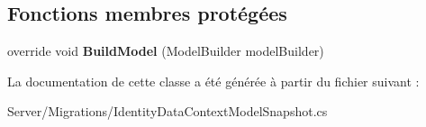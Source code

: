 \subsection*{Fonctions membres protégées}
\begin{DoxyCompactItemize}
\item 
\mbox{\label{class_mediwatch_1_1_server_1_1_migrations_1_1_identity_data_context_model_snapshot_a0d86a793fac77b235571009b08163338}} 
override void {\bfseries Build\+Model} (Model\+Builder model\+Builder)
\end{DoxyCompactItemize}


La documentation de cette classe a été générée à partir du fichier suivant \+:\begin{DoxyCompactItemize}
\item 
Server/\+Migrations/Identity\+Data\+Context\+Model\+Snapshot.\+cs\end{DoxyCompactItemize}
